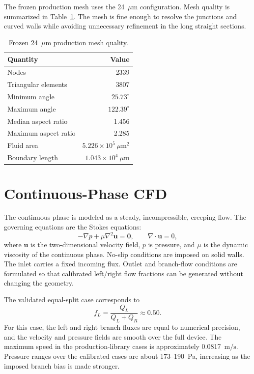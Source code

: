 \documentclass[11pt]{article}
\begin{document}
The frozen production mesh uses the 24~\(\mu\mathrm{m}\) configuration. Mesh
quality is summarized in Table~\ref{tab:mesh-quality}. The mesh is fine enough
to resolve the junctions and curved walls while avoiding unnecessary refinement
in the long straight sections.

\begin{table}[H]
\centering
\caption{Frozen 24~\(\mu\mathrm{m}\) production mesh quality.}
\label{tab:mesh-quality}
\begin{tabular}{@{}lr@{}}
\toprule
Quantity & Value \\
\midrule
Nodes & 2339 \\
Triangular elements & 3807 \\
Minimum angle & \(25.73^\circ\) \\
Maximum angle & \(122.39^\circ\) \\
Median aspect ratio & 1.456 \\
Maximum aspect ratio & 2.285 \\
Fluid area & \(5.226 \times 10^5~\mu\mathrm{m}^2\) \\
Boundary length & \(1.043 \times 10^4~\mu\mathrm{m}\) \\
\bottomrule
\end{tabular}
\end{table}

\section{Continuous-Phase CFD}

The continuous phase is modeled as a steady, incompressible, creeping flow.
The governing equations are the Stokes equations:
\[
-\nabla p + \mu \nabla^2 \mathbf{u} = \mathbf{0},
\qquad
\nabla \cdot \mathbf{u} = 0,
\]
where \(\mathbf{u}\) is the two-dimensional velocity field, \(p\) is pressure,
and \(\mu\) is the dynamic viscosity of the continuous phase. No-slip conditions
are imposed on solid walls. The inlet carries a fixed incoming flux. Outlet
and branch-flow conditions are formulated so that calibrated left/right flow
fractions can be generated without changing the geometry.

The validated equal-split case corresponds to
\[
f_L = \frac{Q_L}{Q_L + Q_R} \approx 0.50.
\]
For this case, the left and right branch fluxes are equal to numerical
precision, and the velocity and pressure fields are smooth over the full device.
The maximum speed in the production-library cases is approximately
0.0817~\(\mathrm{m/s}\). Pressure ranges over the calibrated cases are about
173--190~Pa, increasing as the imposed branch bias is made stronger.
\end{document}
